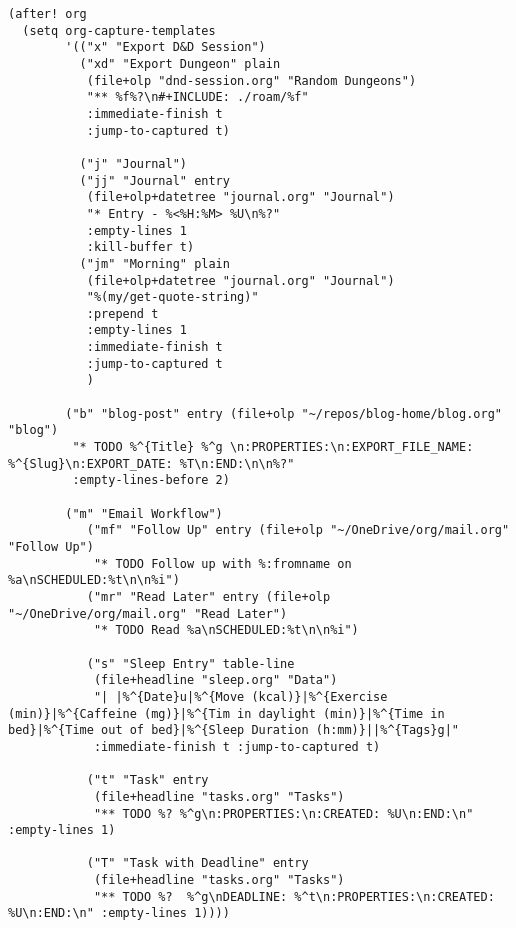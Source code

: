 \documentclass[11pt]{article}
\begin{document}
\begin{verbatim}
(after! org
  (setq org-capture-templates
        '(("x" "Export D&D Session")
          ("xd" "Export Dungeon" plain
           (file+olp "dnd-session.org" "Random Dungeons")
           "** %f%?\n#+INCLUDE: ./roam/%f"
           :immediate-finish t
           :jump-to-captured t)

          ("j" "Journal")
          ("jj" "Journal" entry
           (file+olp+datetree "journal.org" "Journal")
           "* Entry - %<%H:%M> %U\n%?"
           :empty-lines 1
           :kill-buffer t)
          ("jm" "Morning" plain
           (file+olp+datetree "journal.org" "Journal")
           "%(my/get-quote-string)"
           :prepend t
           :empty-lines 1
           :immediate-finish t
           :jump-to-captured t
           )

        ("b" "blog-post" entry (file+olp "~/repos/blog-home/blog.org" "blog")
         "* TODO %^{Title} %^g \n:PROPERTIES:\n:EXPORT_FILE_NAME: %^{Slug}\n:EXPORT_DATE: %T\n:END:\n\n%?"
         :empty-lines-before 2)

        ("m" "Email Workflow")
           ("mf" "Follow Up" entry (file+olp "~/OneDrive/org/mail.org" "Follow Up")
            "* TODO Follow up with %:fromname on %a\nSCHEDULED:%t\n\n%i")
           ("mr" "Read Later" entry (file+olp "~/OneDrive/org/mail.org" "Read Later")
            "* TODO Read %a\nSCHEDULED:%t\n\n%i")

           ("s" "Sleep Entry" table-line
            (file+headline "sleep.org" "Data")
            "| |%^{Date}u|%^{Move (kcal)}|%^{Exercise (min)}|%^{Caffeine (mg)}|%^{Tim in daylight (min)}|%^{Time in bed}|%^{Time out of bed}|%^{Sleep Duration (h:mm)}||%^{Tags}g|"
            :immediate-finish t :jump-to-captured t)

           ("t" "Task" entry
            (file+headline "tasks.org" "Tasks")
            "** TODO %? %^g\n:PROPERTIES:\n:CREATED: %U\n:END:\n" :empty-lines 1)

           ("T" "Task with Deadline" entry
            (file+headline "tasks.org" "Tasks")
            "** TODO %?  %^g\nDEADLINE: %^t\n:PROPERTIES:\n:CREATED: %U\n:END:\n" :empty-lines 1))))
\end{verbatim}
\end{document}
